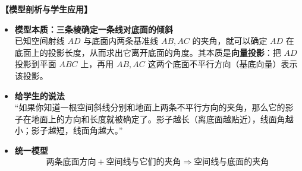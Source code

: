 \documentclass[11pt,a4paper]{ctexart}
\begin{document}
\noindent\textbf{【模型剖析与学生应用】}
\begin{itemize}
    \item \textbf{模型本质：三条棱确定一条线对底面的倾斜} \\
    已知空间射线 $AD$ 与底面内两条基准线 $AB, AC$ 的夹角，就可以确定 $AD$ 在底面上的投影长度，从而求出它离开底面的角度。其本质是\textbf{向量投影}：把 $AD$ 投影到平面 $ABC$ 上，再用 $AB, AC$ 这两个底面不平行方向（基底向量）表示该投影。
    \item \textbf{给学生的说法} \\
    “如果你知道一根空间斜线分别和地面上两条不平行方向的夹角，那么它的影子在地面上的方向和长度就被确定了。影子越长（离底面越贴近），线面角越小；影子越短，线面角越大。”
    \item \textbf{统一模型} \\
    \[ \text{两条底面方向} + \text{空间线与它们的夹角} \Rightarrow \text{空间线与底面的夹角} \]
\end{itemize}
\end{document}
